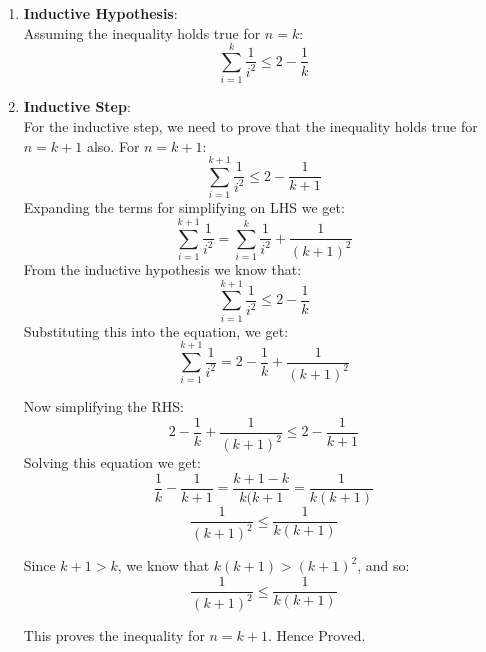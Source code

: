 \documentclass[11pt]{article}
\begin{document}
\begin{enumerate}
\begin{enumerate}
    \item \textbf{Inductive Hypothesis}:\\
    Assuming the inequality holds true for $n = k$:
    \begin{equation*}
        \sum_{i=1}^{k} \frac{1}{i^2} \leq 2 - \frac{1}{k}
    \end{equation*}
    \item \textbf{Inductive Step}:\\
    For the inductive step, we need to prove that the inequality holds true for $n = k + 1$ also.
    For $n = k+1$: \\
    \begin{equation*}
        \sum_{i=1}^{k+1} \frac{1}{i^2} \leq 2 - \frac{1}{k+1}
    \end{equation*}
    Expanding the terms for simplifying on LHS we get: \\
    \begin{equation*}
        \sum_{i=1}^{k+1} \frac{1}{i^2} = \sum_{i=1}^{k}\frac{1}{i^2} + \frac{1}{(k+1)^2}
    \end{equation*}
    From the inductive hypothesis we know that:
    \begin{equation*}
        \sum_{i=1}^{k+1} \frac{1}{i^2} \leq 2 - \frac{1}{k}
    \end{equation*}
    Substituting this into the equation, we get:
    \begin{equation*}
        \sum_{i=1}^{k+1} \frac{1}{i^2} = 2 - \frac{1}{k} + \frac{1}{(k+1)^2}
    \end{equation*}

    Now simplifying the RHS:
    \begin{equation*}
        2 - \frac{1}{k} + \frac{1}{(k+1)^2} \leq 2 - \frac{1}{k+1}
    \end{equation*}
    Solving this equation we get:
    \begin{equation*}
        \frac{1}{k} - \frac{1}{k+1} = \frac{k+1-k}{k(k+1} = \frac{1}{k(k+1)}
    \end{equation*}
    \begin{equation*}
        \frac{1}{(k+1)^2} \leq \frac{1}{k(k+1)}
    \end{equation*}

    Since $k + 1 > k$, we know that $k(k+1) > (k+1)^2$, and so:
    \begin{equation*}
        \frac{1}{(k+1)^2} \leq \frac{1}{k(k+1)}
    \end{equation*}

    This proves the inequality for \( n = k+1 \).
    $\text{Hence Proved.}$
\end{enumerate}


\end{enumerate}
\end{document}
